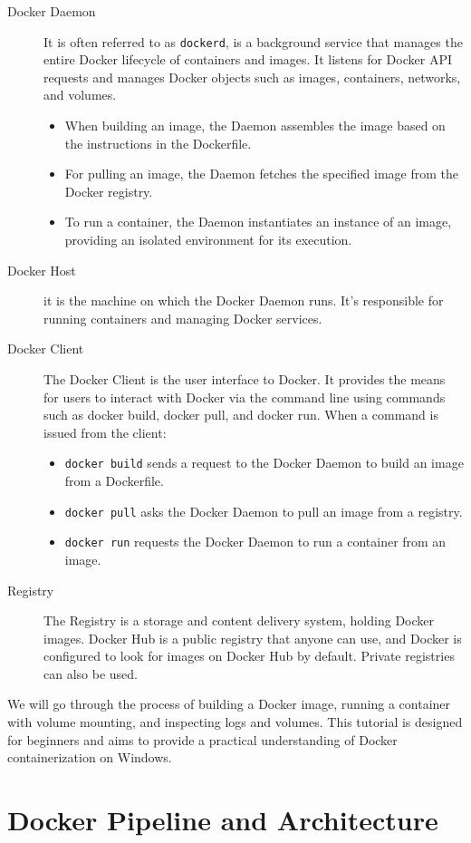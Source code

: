 \documentclass{article}
\begin{document}
\begin{description}
\item[Docker Daemon] It is often referred to as \texttt{dockerd}, is a background service that manages the entire Docker lifecycle of containers and images. It listens for Docker API requests and manages Docker objects such as images, containers, networks, and volumes.
\begin{itemize}
\item When building an image, the Daemon assembles the image based on the instructions in the Dockerfile.
\item For pulling an image, the Daemon fetches the specified image from the Docker registry.
\item To run a container, the Daemon instantiates an instance of an image, providing an isolated environment for its execution.
\end{itemize}
\item[Docker Host] it is the machine on which the Docker Daemon runs. It's responsible for running containers and managing Docker services.
\item[Docker Client] The Docker Client is the user interface to Docker. It provides the means for users to interact with Docker via the command line using commands such as docker build, docker pull, and docker run. When a command is issued from the client:
\begin{itemize}
\item \texttt{docker build} sends a request to the Docker Daemon to build an image from a Dockerfile.
\item \texttt{docker pull} asks the Docker Daemon to pull an image from a registry.
\item \texttt{docker run} requests the Docker Daemon to run a container from an image.
\end{itemize}
\item[Registry] The Registry is a storage and content delivery system, holding Docker images. Docker Hub is a public registry that anyone can use, and Docker is configured to look for images on Docker Hub by default. Private registries can also be used.
\end{description}

We will go through the process of building a Docker image, running a container with volume mounting, and inspecting logs and volumes. This tutorial is designed for beginners and aims to provide a practical understanding of Docker containerization on Windows.

\section{Docker Pipeline and Architecture}
\end{document}

